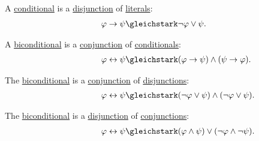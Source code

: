 \begin{proposition}
\begin{thmenum}
     A \hyperref[def:propositional_language/connectives/conditional]{conditional} is a \hyperref[def:propositional_language/connectives/disjunction]{disjunction} of \hyperref[def:conjunctive_disjunctive_normal_form/literal]{literals}:
    \begin{equation}\label{eq:thm:boolean_equivalences/conditional_cnf}
      \begin{aligned}
        \mathllap{\varphi \rightarrow \psi} &\gleichstark \mathrlap{ \neg \varphi \vee \psi. }
      \end{aligned}
    \end{equation}

     A \hyperref[def:propositional_language/connectives/biconditional]{biconditional} is a \hyperref[def:propositional_language/connectives/conjunction]{conjunction} of \hyperref[def:propositional_language/connectives]{conditionals}:
    \begin{equation}\label{eq:thm:boolean_equivalences/biconditional_via_conditionals}
      \begin{aligned}
        \mathllap{\varphi \leftrightarrow \psi} &\gleichstark \mathrlap{(\varphi \rightarrow \psi) \wedge (\psi \rightarrow \varphi).}
      \end{aligned}
    \end{equation}

     The \hyperref[def:propositional_language/connectives/biconditional]{biconditional} is a \hyperref[def:propositional_language/connectives/disjunction]{conjunction} of \hyperref[def:propositional_language/connectives/conjunction]{disjunctions}:
    \begin{equation}\label{eq:thm:boolean_equivalences/biconditional_cnf}
      \begin{aligned}
        \mathllap{\varphi \leftrightarrow \psi} &\gleichstark \mathrlap{(\neg \varphi \vee \psi) \wedge (\neg \varphi \vee \psi).}
      \end{aligned}
    \end{equation}

     The \hyperref[def:propositional_language/connectives/biconditional]{biconditional} is a \hyperref[def:propositional_language/connectives/disjunction]{disjunction} of \hyperref[def:propositional_language/connectives/conjunction]{conjunctions}:
    \begin{equation}\label{eq:thm:boolean_equivalences/biconditional_dnf}
      \begin{aligned}
        \mathllap{\varphi \leftrightarrow \psi} &\gleichstark \mathrlap{(\varphi \wedge \psi) \vee (\neg \varphi \wedge \neg \psi).}
      \end{aligned}
    \end{equation}


\end{thmenum}
\end{proposition}
